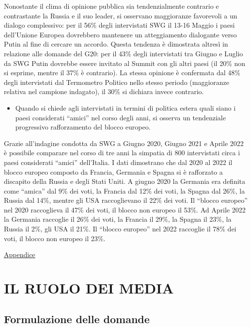 \documentclass[
]{book}
\providecommand{\tightlist}{%
  \setlength{\itemsep}{0pt}\setlength{\parskip}{0pt}}
\begin{document}
Nonostante il clima di opinione pubblica sia tendenzialmente contrario e contrastante la Russia e il suo leader, si osservano maggioranze favorevoli a un dialogo complessivo: per il 56\% degli intervistati SWG il 13-16 Maggio i paesi dell'Unione Europea dovrebbero mantenere un atteggiamento dialogante verso Putin al fine di cercare un accordo.
Questa tendenza è dimostrata altresì in relazione alle domande del G20: per il 43\% degli intervistati tra Giugno e Luglio da SWG Putin dovrebbe essere invitato al Summit con gli altri paesi (il 20\% non si esprime, mentre il 37\% è contrario). La stessa opinione è confermata dal 48\% degli intervistati dal Termometro Politico nello stesso periodo (maggioranze relativa nel campione indagato), il 30\% si dichiara invece contrario.

\begin{itemize}
\tightlist
\item
  Quando si chiede agli intervistati in termini di politica estera quali siano i paesi considerati ``amici'' nel corso degli anni, si osserva un tendenziale progressivo rafforzamento del blocco europeo.
\end{itemize}

Grazie all'indagine condotta da SWG a Giugno 2020, Giugno 2021 e Aprile 2022 è possibile comparare nel corso di tre anni la simpatia di 800 intervistati circa i paesi considerati ``amici'' dell'Italia. I dati dimostrano che dal 2020 al 2022 il blocco europeo composto da Francia, Germania e Spagna si è rafforzato a discapito della Russia e degli Stati Uniti.
A giugno 2020 la Germania era definita come ``amica'' dal 9\% dei voti, la Francia dal 12\% dei voti, la Spagna dal 26\%, la Russia dal 14\%, mentre gli USA raccoglievano il 22\% dei voti. Il ``blocco europeo'' nel 2020 raccoglieva il 47\% dei voti, il blocco non europeo il 53\%.
Ad Aprile 2022 la Germania raccoglie il 26\% dei voti, la Francia il 29\%, la Spagna il 23\%, la Russia il 2\%, gli USA il 21\%. Il ``blocco europeo'' nel 2022 raccoglie il 78\% dei voti, il blocco non europeo il 23\%.

\href{https://github.com/LucianaFazio/Ucrania/blob/main/VII.\%20Il\%20clima\%20di\%20opinione\%20v.3.pdf}{Appendice}

\hypertarget{il-ruolo-dei-media}{%
\chapter{IL RUOLO DEI MEDIA}\label{il-ruolo-dei-media}}

\hypertarget{formulazione-delle-domande-6}{%
\section{Formulazione delle domande}\label{formulazione-delle-domande-6}}
\end{document}
